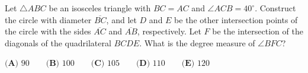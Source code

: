 Let $\triangle ABC$ be an isosceles triangle with $BC=AC$ and $\angle ACB=40^\circ$. Construct the circle with diameter $\overline{BC}$, and let $D$ and $E$ be the other intersection points of the circle with the sides $\overline{AC}$ and $\overline{AB}$, respectively. Let $F$ be the intersection of the diagonals of the quadrilateral $BCDE$. What is the degree measure of $\angle BFC$?

$\textbf{(A) } 90 \qquad\textbf{(B) } 100 \qquad\textbf{(C) } 105 \qquad\textbf{(D) } 110 \qquad\textbf{(E) } 120$
